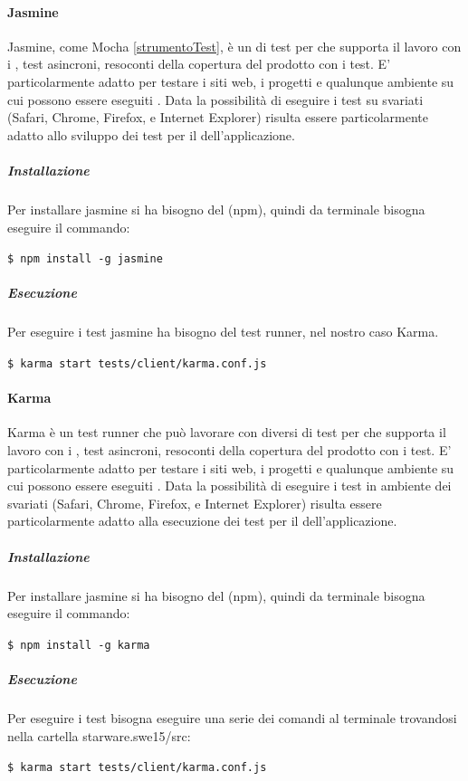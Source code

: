\documentclass[12pt,a4paper]{article}
\begin{document}
\paragraph{Jasmine} \label{jasmine}
Jasmine, come Mocha \ref{strumentoTest}, è un  di test per  che supporta il lavoro con i , test asincroni, resoconti della copertura del prodotto con i test. E' particolarmente adatto per testare i siti web, i progetti  e qualunque ambiente su cui possono essere eseguiti . Data la possibilità di eseguire i test su svariati  (Safari, Chrome, Firefox, e Internet Explorer) risulta essere particolarmente adatto allo sviluppo dei test per il  dell'applicazione.
\subparagraph{Installazione}
Per installare jasmine si ha bisogno del  (npm), quindi da terminale bisogna eseguire il commando:
\begin{center}
	\texttt{\$ npm install -g jasmine}  
\end{center}
\subparagraph{Esecuzione}
Per eseguire i test jasmine ha bisogno del test runner, nel nostro caso Karma.
\begin{center}
\texttt{\$ karma start tests/client/karma.conf.js}  
\end{center}
\paragraph{Karma} \label{karma}
Karma è un test runner che può lavorare con diversi  di test per  che supporta il lavoro con i , test asincroni, resoconti della copertura del prodotto con i test. E' particolarmente adatto per testare i siti web, i progetti  e qualunque ambiente su cui possono essere eseguiti . Data la possibilità di eseguire i test in ambiente dei svariati  (Safari, Chrome, Firefox, e Internet Explorer) risulta essere particolarmente adatto alla esecuzione dei test per il  dell'applicazione.
\subparagraph{Installazione}
Per installare jasmine si ha bisogno del  (npm), quindi da terminale bisogna eseguire il commando:
\begin{center}
	\texttt{\$ npm install -g karma}  
\end{center}
\subparagraph{Esecuzione}
Per eseguire i test bisogna eseguire una serie dei comandi al terminale trovandosi nella cartella starware.swe15/src: \begin{center}
\texttt{\$ karma start tests/client/karma.conf.js}  
\end{center}
\end{document}
